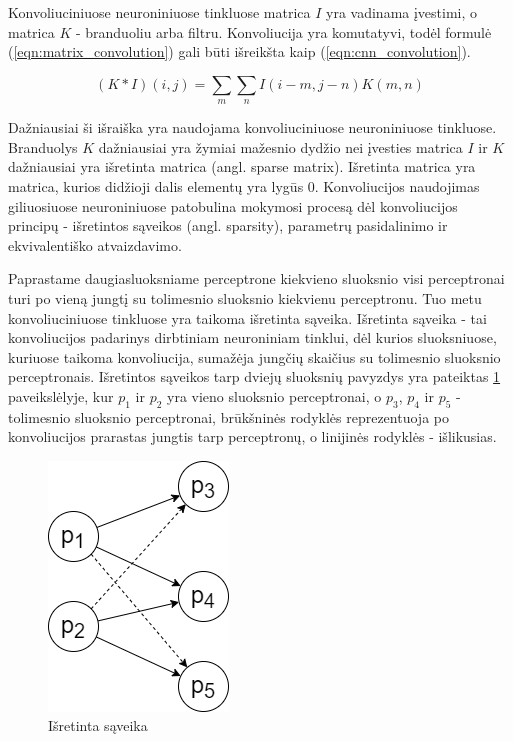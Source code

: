 Konvoliuciniuose neuroniniuose tinkluose matrica $I$ yra vadinama įvestimi, o matrica $K$ - branduoliu arba filtru. Konvoliucija yra komutatyvi, todėl formulė (\ref{eqn:matrix_convolution}) gali būti išreikšta kaip (\ref{eqn:cnn_convolution}).

\begin{equation}
\label{eqn:cnn_convolution}
	(K * I)(i, j) = \sum_{m} \sum_{n} I(i - m, j - n) K(m, n)
\end{equation}

Dažniausiai ši išraiška yra naudojama konvoliuciniuose neuroniniuose tinkluose. Branduolys $K$ dažniausiai yra žymiai mažesnio dydžio nei įvesties matrica $I$ ir $K$ dažniausiai yra išretinta matrica (angl. sparse matrix). Išretinta matrica yra matrica, kurios didžioji dalis elementų yra lygūs 0. Konvoliucijos naudojimas giliuosiuose neuroniniuose patobulina mokymosi procesą dėl konvoliucijos principų - išretintos sąveikos (angl. sparsity), parametrų pasidalinimo ir ekvivalentiško atvaizdavimo.

Paprastame daugiasluoksniame perceptrone kiekvieno sluoksnio visi perceptronai turi po vieną jungtį su tolimesnio sluoksnio kiekvienu perceptronu. Tuo metu konvoliuciniuose tinkluose yra taikoma išretinta sąveika. Išretinta sąveika - tai konvoliucijos padarinys dirbtiniam neuroniniam tinklui, dėl kurios sluoksniuose, kuriuose taikoma konvoliucija, sumažėja jungčių skaičius su tolimesnio sluoksnio perceptronais. Išretintos sąveikos tarp dviejų sluoksnių pavyzdys yra pateiktas \ref{img:sparsity} paveikslėlyje, kur $p_1$ ir $p_2$ yra vieno sluoksnio perceptronai, o $p_3$, $p_4$ ir $p_5$ - tolimesnio sluoksnio perceptronai, brūkšninės rodyklės reprezentuoja po konvoliucijos prarastas jungtis tarp perceptronų, o linijinės rodyklės - išlikusias.

\begin{figure}[H]
	\centering
	\includegraphics[scale=0.5]{img/sparsity.png}
	\caption{Išretinta sąveika}
	\label{img:sparsity}
\end{figure}

